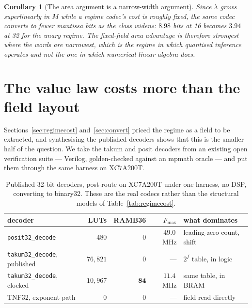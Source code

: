 \documentclass[11pt]{article}
\newtheorem{corollary}{Corollary}
\theoremstyle{definition}
\begin{document}
\begin{corollary}[The area argument is a narrow-width argument]
\label{cor:narrow}
Since $\lambda$ grows superlinearly in $M$ while a regime codec's cost is roughly
fixed, the same codec converts to fewer mantissa bits as the class widens:
$8.98$ bits at 16 becomes $3.94$ at 32 for the unary regime. The fixed-field area
advantage is therefore strongest where the words are narrowest, which is the
regime in which quantised inference operates and not the one in which numerical
linear algebra does.
\end{corollary}


\section{The value law costs more than the field layout}
\label{sec:valuelaw}

Sections~\ref{sec:regimecost} and~\ref{sec:convert} priced the regime as a field
to be extracted, and synthesising the published decoders shows that this is the
smaller half of the question. We take the takum and posit decoders from an
existing open verification suite --- Verilog, golden-checked against an mpmath
oracle --- and put them through the same harness on XC7A200T.

\begin{table}[t]\centering
\caption{Published 32-bit decoders, post-route on XC7A200T under one harness, no
DSP, converting to binary32. These are the real codecs rather than the structural
models of Table~\ref{tab:regimecost}.}
\label{tab:realcodecs}
\begin{tabular}{lrrrl}
\toprule
decoder & LUTs & RAMB36 & $F_{\max}$ & what dominates \\
\midrule
\texttt{posit32\_decode} & $480$ & $0$ & $49.0$\,MHz & leading-zero count, shift \\
\texttt{takum32\_decode}, published & $76{,}821$ & $0$ & --- & $2^{f}$ table, in logic \\
\texttt{takum32\_decode}, clocked & $10{,}967$ & $\mathbf{84}$ & $11.4$\,MHz & same table, in BRAM \\
TNF32, exponent path & $0$ & $0$ & --- & field read directly \\
\bottomrule
\end{tabular}
\end{table}
\end{document}
